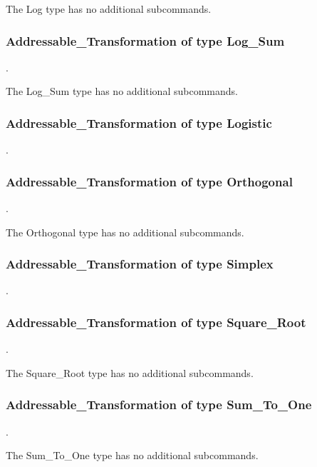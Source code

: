 The Log type has no additional subcommands.
\subsubsection{Addressable\_Transformation of type Log\_Sum}
.
\label{syntax:AddressableTransformation-LogSum}

The Log\_Sum type has no additional subcommands.
\subsubsection{Addressable\_Transformation of type Logistic}
.
\label{syntax:AddressableTransformation-Logistic}



\subsubsection{Addressable\_Transformation of type Orthogonal}
.
\label{syntax:AddressableTransformation-Orthogonal}

The Orthogonal type has no additional subcommands.
\subsubsection{Addressable\_Transformation of type Simplex}
.
\label{syntax:AddressableTransformation-Simplex}


\subsubsection{Addressable\_Transformation of type Square\_Root}
.
\label{syntax:AddressableTransformation-SquareRoot}

The Square\_Root type has no additional subcommands.
\subsubsection{Addressable\_Transformation of type Sum\_To\_One}
.
\label{syntax:AddressableTransformation-SumToOne}

The Sum\_To\_One type has no additional subcommands.
